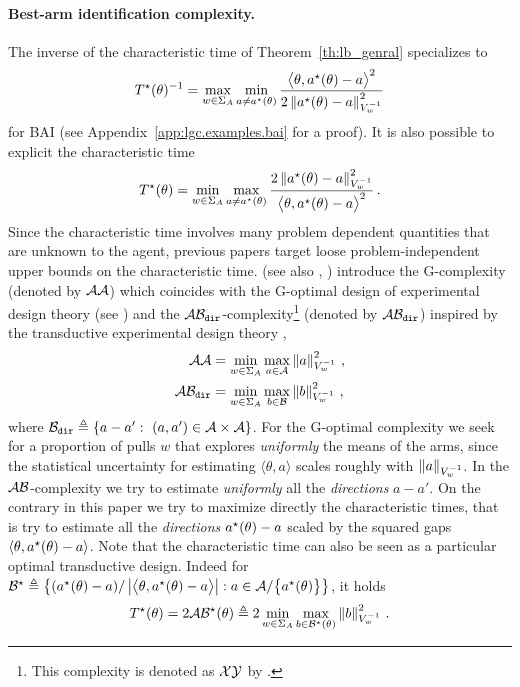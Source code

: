 \paragraph{Best-arm identification complexity.}
The inverse of the characteristic time of Theorem~\ref{th:lb_genral} specializes to
\[
T^{\star}(\theta)^{-1} = \max_{w\in\Sigma_A} \min_{a\neq a^\star(\theta)} \frac{\big\langle \theta, a^\star(\theta)-a\big\rangle^2}{2 \left\lVert a^\star(\theta)-a\right\rVert_{V_w^{-1}}^2}
\]
for BAI (see Appendix~\ref{app:lgc.examples.bai} for a proof). It is also possible to explicit the characteristic time
\[
T^{\star}(\theta) = \min_{w\in\Sigma_A} \max_{a\neq a^\star(\theta)} \frac{2\left\lVert a^\star(\theta)-a\right\rVert_{V_w^{-1}}^2}{\big\langle \theta, a^\star(\theta)-a\big\rangle^2}\,.
\]
Since the characteristic time involves many problem dependent quantities that are unknown to the agent, previous papers target loose problem-independent upper bounds on the characteristic time. \citet{soare2014linear} (see also \citealt{tao2018alba}, \citealt{fiez2019transductive}) introduce the G-complexity (denoted by $\mathcal{A}\mathcal{A}$) which coincides with the G-optimal design of experimental design theory (see \citealt{pukelsheim2006optimal}) and the $\mathcal{A}\mathcal{B}_{\texttt{dir}}$-complexity\footnote{This complexity is denoted as $\mathcal{X}\mathcal{Y}$ by \citet{soare2014linear}.} (denoted by $\mathcal{A}\mathcal{B}_{\texttt{dir}}$) inspired by the transductive experimental design theory  \citep{yu2006active},
\begin{align*}
\mathcal{A}\mathcal{A} &=\min_{w\in\Sigma_A} \max_{a\in\mathcal{A}} \left\lVert a\right\rVert_{V_w^{-1}}^2\,,\\
\mathcal{A}\mathcal{B}_{\texttt{dir}} &=\min_{w\in\Sigma_A} \max_{b\in\mathcal{B}} \left\lVert b\right\rVert_{V_w^{-1}}^2\,,
\end{align*}
where $\cB_{\texttt{dir}}\eqdef\{a-a':\ (a,a')\in\cA\times\cA\}$. For the G-optimal complexity we seek for a proportion of pulls $w$ that explores \emph{uniformly} the means of the arms, since the statistical uncertainty for estimating $\langle \theta,a\rangle$ scales roughly with $\left\lVert a\right\rVert_{V_w^{-1}}$. In the $\mathcal{A}\mathcal{B}$-complexity we try to estimate \emph{uniformly} all the \emph{directions} $a-a'$. On the contrary in this paper we try to maximize directly the characteristic times, that is try to estimate all the \emph{directions} $a^\star(\theta) - a$ scaled by the squared gaps $\langle\theta,a^\star(\theta)-a\rangle$.
Note that the characteristic time can also be seen as a particular optimal transductive design. Indeed for $\mathcal{B}^\star \triangleq \left\{ (a^\star(\theta)- a)/\left|\big\langle \theta, a^\star(\theta)-a\big\rangle\right|: a\in\mathcal{A}/\big\{a^\star(\theta)\big\}  \right\}$, it holds
\[
T^{\star}(\theta) = 2 \mathcal{A}\mathcal{B}^\star(\theta) \triangleq 2 \min_{w\in\Sigma_A} \max_{b\in\mathcal{B}^\star(\theta)} \left\lVert b\right\rVert_{V_w^{-1}}^2\,.
\]
